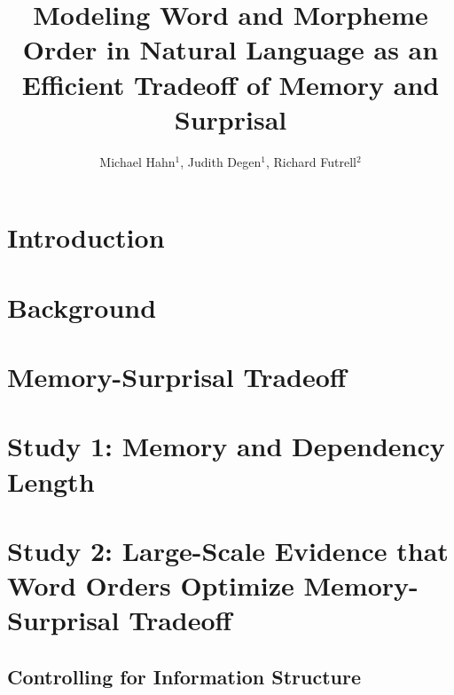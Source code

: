 \documentclass[man]{apa7}
\title{Modeling Word and Morpheme Order in Natural Language as an Efficient Tradeoff of Memory and Surprisal}
\author{Michael Hahn$^1$, Judith Degen$^1$, Richard Futrell$^2$}
\affiliation{$^1$ Stanford University, $^2$ University of California, Irvine}
\newcommand{\jd}[1]{\textcolor{Purple}{[jd: #1]}}
\begin{document}
\maketitle


\section{Introduction}



\section{Background}\label{sec:background}





\section{Memory-Surprisal Tradeoff}\label{sec:ms-tradeoff}



\section{Study 1: Memory and Dependency Length}\label{sec:toy-study}





\section{Study 2: Large-Scale Evidence that Word Orders Optimize Memory-Surprisal Tradeoff}
\label{sec:main-experiment}



\subsection{Controlling for Information Structure}\label{subsec:freedom}


\end{document}
